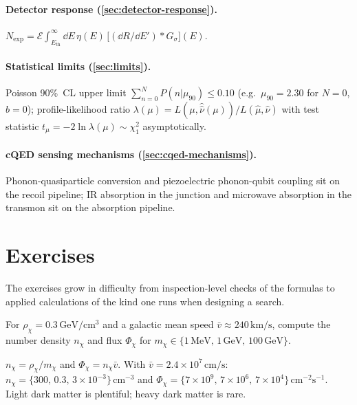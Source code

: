 \begin{chaptersummary}
\paragraph{Detector response (\cref{sec:detector-response}).}
$N_\text{exp}=\mathcal E\!\int_{E_\text{th}}^\infty\!\dd E\,\eta(E)\,
\bigl[(\dd R/\dd E')\!\ast\!G_\sigma\bigr](E)$.

\paragraph{Statistical limits (\cref{sec:limits}).}
Poisson 90\%~CL upper limit
$\sum_{n=0}^N P(n|\mu_{90})\leq 0.10$ (e.g.\ $\mu_{90}=2.30$ for
$N=0$, $b=0$); profile-likelihood ratio
$\lambda(\mu)=L(\mu,\hat{\hat\nu}(\mu))/L(\hat\mu,\hat\nu)$ with
test statistic $t_\mu=-2\ln\lambda(\mu)\sim\chi^2_1$ asymptotically.

\paragraph{cQED sensing mechanisms (\cref{sec:cqed-mechanisms}).}
Phonon-quasiparticle conversion and piezoelectric phonon-qubit
coupling sit on the recoil pipeline; IR absorption in the junction
and microwave absorption in the transmon sit on the absorption
pipeline.

\end{chaptersummary}

\section*{Exercises}

The exercises grow in difficulty from inspection-level checks of
the formulas to applied calculations of the kind one runs when
designing a search.

\begin{exercise}
For $\rho_\chi=0.3\,\text{GeV}/\text{cm}^3$ and a galactic
mean speed $\bar v\approx 240\,\text{km}/\text{s}$, compute the
number density $n_\chi$ and flux $\Phi_\chi$ for
$m_\chi\in\{1\,\text{MeV},\,1\,\text{GeV},\,100\,\text{GeV}\}$.
\begin{solution}
$n_\chi=\rho_\chi/m_\chi$ and $\Phi_\chi=n_\chi\bar v$. With
$\bar v=2.4\times 10^7\,\text{cm}/\text{s}$:
$n_\chi=\{300,\,0.3,\,3\times 10^{-3}\}\,\text{cm}^{-3}$ and
$\Phi_\chi=\{7\times 10^9,\,7\times 10^6,\,7\times 10^4\}\,\text{cm}^{-2}\text{s}^{-1}$.
Light dark matter is plentiful; heavy dark matter is rare.
\end{solution}
\end{exercise}

